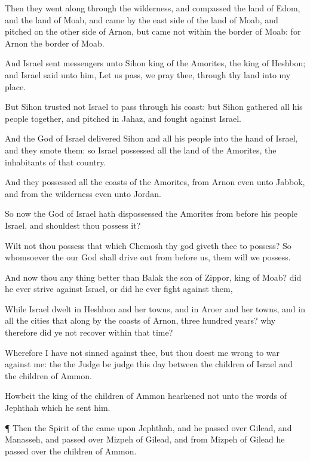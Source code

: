 {Then they went
along through the
wilderness, and
compassed the
land of
Edom, and the
land of
Moab, and
came by the east
side of the
land of
Moab, and
pitched on the other
side of
Arnon, but
came not within the
border of
Moab: for
Arnon
{} the
border of
Moab.

And
Israel
sent
messengers unto
Sihon
king of the
Amorites, the
king of
Heshbon; and
Israel
said unto him, Let us
pass, we pray thee, through thy
land
into my
place.

But
Sihon
trusted not
Israel to
pass through his
coast: but
Sihon
gathered all his
people
together, and
pitched in
Jahaz, and
fought against
Israel.

And the
{}
God of
Israel
delivered
Sihon and all his
people into the
hand of
Israel, and they
smote them: so
Israel
possessed all the
land of the
Amorites, the
inhabitants of that
country.

And they
possessed all the
coasts of the
Amorites, from
Arnon even unto
Jabbok, and from the
wilderness even unto
Jordan.

So now the
{}
God of
Israel hath
dispossessed the
Amorites from
before his
people
Israel, and shouldest thou
possess it?

Wilt not thou
possess that which
Chemosh thy
god giveth thee to
possess? So whomsoever the
{} our
God shall drive
out from
before us, them will we
possess.

And now
{} thou any thing
better than
Balak the
son of
Zippor,
king of
Moab? did he
ever
strive against
Israel, or did he
ever
fight against them,

While
Israel
dwelt in
Heshbon and her
towns, and in
Aroer and her
towns, and in all the
cities that
{} along by the
coasts of
Arnon,
three
hundred
years? why therefore did ye not
recover
{} within that
time?

Wherefore I have not
sinned against thee, but thou
doest me
wrong to
war against me: the
{} the
Judge be
judge this
day between the
children of
Israel and the
children of
Ammon.

Howbeit the
king of the
children of
Ammon
hearkened not unto the
words of
Jephthah which he
sent him.


\par }{\PP {}¶ Then the
Spirit of the
{} came upon
Jephthah, and he passed
over
Gilead, and
Manasseh, and passed
over
Mizpeh of
Gilead, and from
Mizpeh of
Gilead he passed
over
{} the
children of
Ammon.

}
